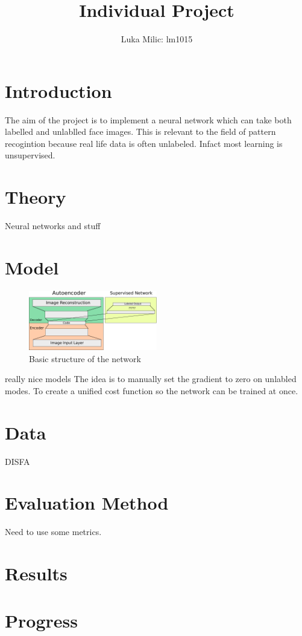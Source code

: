 \documentclass[11pt]{article}
\title{Individual Project}
\author{Luka Milic: lm1015}
\begin{document}
\maketitle
\section{Introduction}
The aim of the project is to implement a neural network which can take both labelled and unlablled face images.
This is relevant to the field of pattern recogintion because real life data is often unlabeled. Infact most learning is unsupervised.
\section{Theory}
Neural networks and stuff
\section{Model}
\begin{figure}
  \begin{center}
    \includegraphics[width=0.5\textwidth]{illustrations/network_01.pdf}
  \end{center}
  \caption{Basic structure of the network}
\end{figure}
really nice models
The idea is to manually set the gradient to zero on unlabled modes. To create a unified cost function so the network can be trained at once.
\section{Data}
DISFA
\section{Evaluation Method}
Need to use some metrics.
\section{Results}
\section{Progress}
\end{document}
